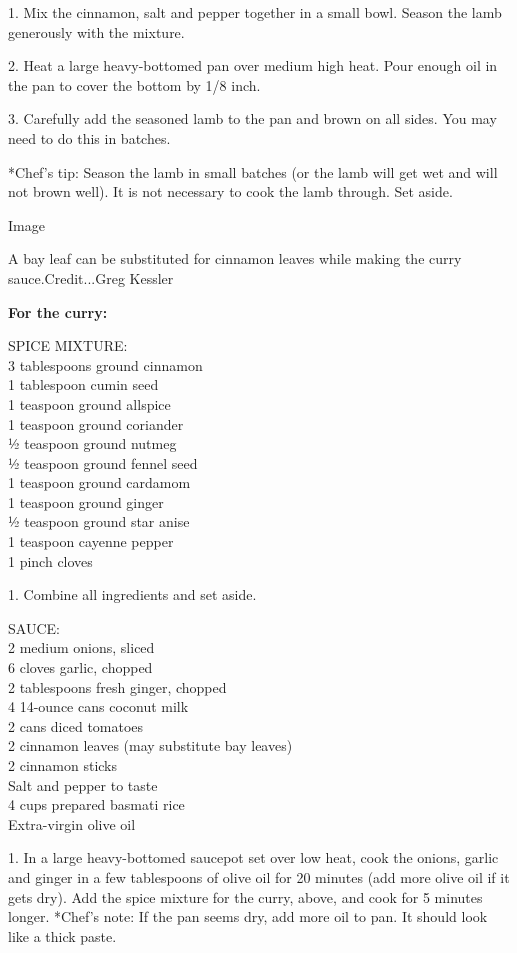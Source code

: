 1. Mix the cinnamon, salt and pepper together in a small bowl. Season
the lamb generously with the mixture.

2. Heat a large heavy-bottomed pan over medium high heat. Pour enough
oil in the pan to cover the bottom by 1/8 inch.

3. Carefully add the seasoned lamb to the pan and brown on all sides.
You may need to do this in batches.

*Chef's tip: Season the lamb in small batches (or the lamb will get wet
and will not brown well). It is not necessary to cook the lamb through.
Set aside.

Image

A bay leaf can be substituted for cinnamon leaves while making the curry
sauce.Credit...Greg Kessler

\textbf{For the curry:}

SPICE MIXTURE:\\
3 tablespoons ground cinnamon\\
1 tablespoon cumin seed\\
1 teaspoon ground allspice\\
1 teaspoon ground coriander\\
½ teaspoon ground nutmeg\\
½ teaspoon ground fennel seed\\
1 teaspoon ground cardamom\\
1 teaspoon ground ginger\\
½ teaspoon ground star anise\\
1 teaspoon cayenne pepper\\
1 pinch cloves

1. Combine all ingredients and set aside.

SAUCE:\\
2 medium onions, sliced\\
6 cloves garlic, chopped\\
2 tablespoons fresh ginger, chopped\\
4 14-ounce cans coconut milk\\
2 cans diced tomatoes\\
2 cinnamon leaves (may substitute bay leaves)\\
2 cinnamon sticks\\
Salt and pepper to taste\\
4 cups prepared basmati rice\\
Extra-virgin olive oil

1. In a large heavy-bottomed saucepot set over low heat, cook the
onions, garlic and ginger in a few tablespoons of olive oil for 20
minutes (add more olive oil if it gets dry). Add the spice mixture for
the curry, above, and cook for 5 minutes longer. *Chef's note: If the
pan seems dry, add more oil to pan. It should look like a thick paste.

